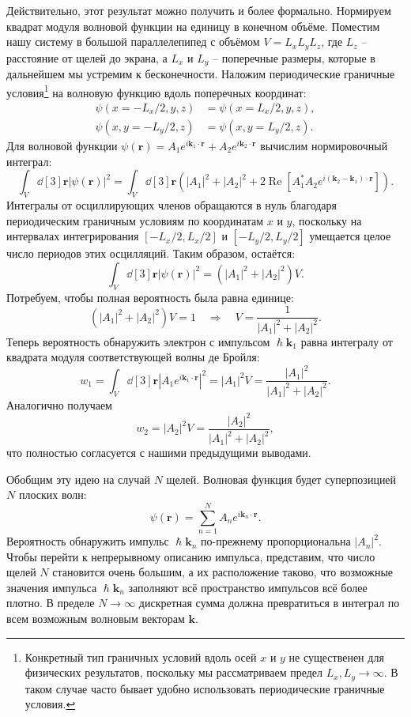 \documentclass[a4paper, 12pt]{article}
\begin{document}
Действительно, этот результат можно получить и более формально. Нормируем
квадрат модуля волновой функции на единицу в конечном объёме. Поместим нашу
систему в большой параллелепипед с объёмом $V = L_x L_y L_z$, где $L_z$ --
расстояние от щелей до экрана, а $L_x$ и $L_y$ -- поперечные размеры, которые в
дальнейшем мы устремим к бесконечности. Наложим периодические граничные
условия\footnote{Конкретный тип граничных условий вдоль осей $x$ и $y$ не существенен
  для физических результатов, поскольку мы рассматриваем предел $L_x, L_y \to \infty$. В
  таком случае часто бывает удобно использовать периодические граничные
  условия.} на волновую функцию вдоль поперечных координат:
\begin{align*}
\psi(x = -L_x/2, y, z) &= \psi(x = L_x/2, y, z), \\
\psi(x, y = -L_y/2, z) &= \psi(x, y = L_y/2, z).
\end{align*}
Для волновой функции $\psi(\bm{r}) = A_1 e^{i \bm{k}_1 \cdot \bm{r}} + A_2 e^{i \bm{k}_2 \cdot \bm{r}}$ вычислим нормировочный интеграл:
\[
\int_V \dd[3]{\bm{r}}|\psi(\bm{r})|^2  = \int_V \dd[3]{\bm{r}} \left( |A_1|^2 + |A_2|^2 + 2\operatorname{Re}[A_1^* A_2 e^{i (\bm{k}_2 - \bm{k}_1) \cdot \bm{r}}] \right).
\]
Интегралы от осциллирующих членов обращаются в нуль благодаря периодическим граничным условиям по координатам $x$ и $y$, поскольку на интервалах интегрирования $[-L_x/2, L_x/2]$ и $[-L_y/2, L_y/2]$ умещается целое число периодов этих осцилляций. Таким образом, остаётся:
\[
\int_V \dd[3]{\bm{r}} |\psi(\bm{r})|^2 = (|A_1|^2 + |A_2|^2) V.
\]
Потребуем, чтобы полная вероятность была равна единице:
\[
(|A_1|^2 + |A_2|^2) V = 1 \quad \Rightarrow \quad V = \frac{1}{|A_1|^2 + |A_2|^2}.
\]
Теперь вероятность обнаружить электрон с импульсом $\hslash \bm{k}_1$ равна интегралу от квадрата модуля соответствующей волны де Бройля:
\[
w_1 = \int_V \dd[3]{\bm{r}}|A_1 e^{i \bm{k}_1 \cdot \bm{r}}|^2 = |A_1|^2 V = \frac{|A_1|^2}{|A_1|^2 + |A_2|^2}.
\]
Аналогично получаем
\[
w_2 = |A_2|^2 V = \frac{|A_2|^2}{|A_1|^2 + |A_2|^2},
\]
что полностью согласуется с нашими предыдущими выводами.

Обобщим эту идею на случай $N$ щелей. Волновая функция будет суперпозицией $N$ плоских волн:
\begin{equation}
\psi(\bm{r}) = \sum_{n=1}^{N} A_n e^{i \bm{k}_n \cdot \bm{r}}.
\label{eq:n_slits}
\end{equation}
Вероятность обнаружить импульс $\hslash \bm{k}_n$ по-прежнему пропорциональна $|A_n|^2$. Чтобы перейти к непрерывному описанию импульса, представим, что число щелей $N$ становится очень большим, а их расположение таково, что возможные значения импульса $\hslash \bm{k}_n$ заполняют всё пространство импульсов всё более плотно. В пределе $N \to \infty$ дискретная сумма должна превратиться в интеграл по всем возможным волновым векторам $\bm{k}$.
\end{document}
